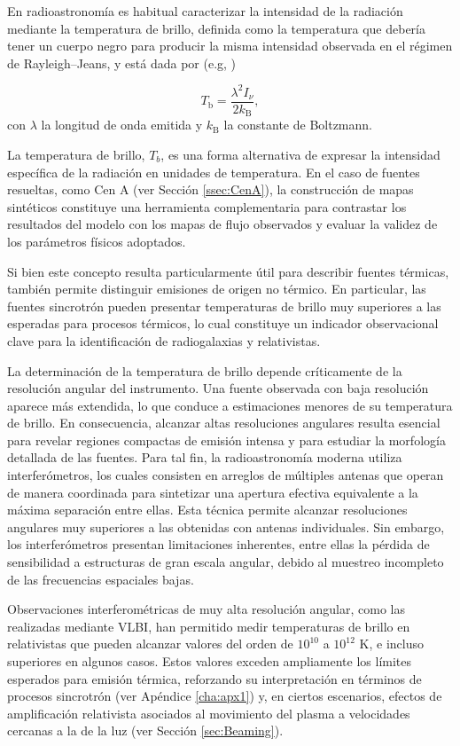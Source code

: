 	En radioastronomía es habitual caracterizar la intensidad de la radiación mediante la temperatura de brillo, definida como la temperatura que debería tener un cuerpo negro para producir la misma intensidad observada en el régimen de Rayleigh--Jeans, y está dada por (e.g, \citealt{Rybicki1979})

\begin{equation}\label{eq:result-1}
    T_\mathrm{b}=\frac{\lambda^2 I_\nu}{2k_\mathrm{B}},
\end{equation}
	con $\lambda$ la longitud de onda emitida y $k_\mathrm{B}$ la constante de Boltzmann.
	
	La temperatura de brillo, $T_b$, es una forma alternativa de expresar la intensidad específica de la radiación en unidades de temperatura. 
	En el caso de fuentes resueltas, como Cen A (ver Sección \ref{ssec:CenA}), la construcci\'on de mapas sintéticos constituye una herramienta complementaria para contrastar los resultados del modelo con los mapas de flujo observados y evaluar la validez de los parámetros físicos adoptados.
	
	Si bien este concepto resulta particularmente útil para describir fuentes térmicas, también permite distinguir emisiones de origen no térmico. 
	En particular, las fuentes sincrotrón pueden presentar temperaturas de brillo muy superiores a las esperadas para procesos térmicos, lo cual constituye un indicador observacional clave para la identificación de radiogalaxias y \jets relativistas.
	
	La determinación de la temperatura de brillo depende críticamente de la resolución angular del instrumento. Una fuente observada con baja resolución aparece más extendida, lo que conduce a estimaciones menores de su temperatura de brillo. 
	En consecuencia, alcanzar altas resoluciones angulares resulta esencial para revelar regiones compactas de emisión intensa y para estudiar la morfología detallada de las fuentes. 
	Para tal fin, la radioastronomía moderna utiliza interferómetros, los cuales consisten en arreglos de múltiples antenas que operan de manera coordinada para sintetizar una apertura efectiva equivalente a la máxima separación entre ellas. 
	Esta técnica permite alcanzar resoluciones angulares muy superiores a las obtenidas con antenas individuales. Sin embargo, los interferómetros presentan limitaciones inherentes, entre ellas la pérdida de sensibilidad a estructuras de gran escala angular, debido al muestreo incompleto de las frecuencias espaciales bajas.

	Observaciones interferométricas de muy alta resolución angular, como las realizadas mediante VLBI, han permitido medir temperaturas de brillo en \jets relativistas que pueden alcanzar valores del orden de $10^{10}$ a $10^{12}$ $\mathrm{K}$, e incluso superiores en algunos casos. 
	Estos valores exceden ampliamente los límites esperados para emisión térmica, reforzando su interpretación en términos de procesos sincrotrón (ver Ap\'endice \ref{cha:apx1}) y, en ciertos escenarios, efectos de amplificación relativista asociados al movimiento del plasma a velocidades cercanas a la de la luz (ver Secci\'on \ref{sec:Beaming}).

